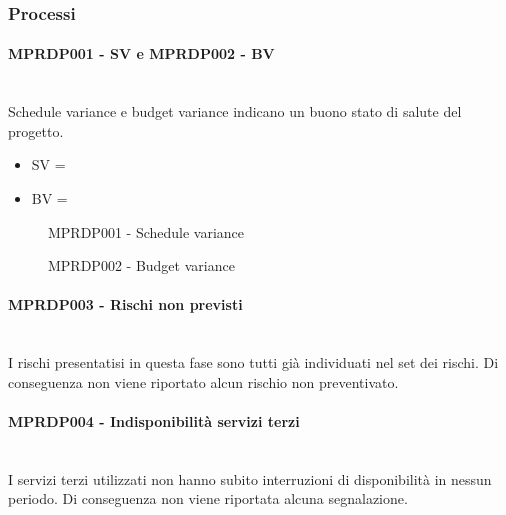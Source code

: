 \subsubsection{Processi}
\paragraph{MPRDP001 - SV e MPRDP002 -  BV}\mbox{}\\[0.4cm]
Schedule variance e budget variance indicano un buono stato di salute del progetto.
\begin{itemize}
	\item SV = 
	\item BV = 
\end{itemize}
\begin{figure}[H]
	\centering
	\caption{\label{fig:mission}MPRDP001 - Schedule variance}
\end{figure}
\begin{figure}[H]
	\centering
	\caption{\label{fig:mission}MPRDP002 - Budget variance}
\end{figure}
\paragraph{MPRDP003 - Rischi non previsti}\mbox{}\\[0.4cm]
I rischi presentatisi in questa fase sono tutti già individuati nel set dei rischi. Di conseguenza non viene riportato alcun rischio non preventivato.
\paragraph{MPRDP004 - Indisponibilità servizi terzi}\mbox{}\\[0.4cm]
I servizi terzi utilizzati non hanno subito interruzioni di disponibilità in nessun periodo. Di conseguenza non viene riportata alcuna segnalazione.
